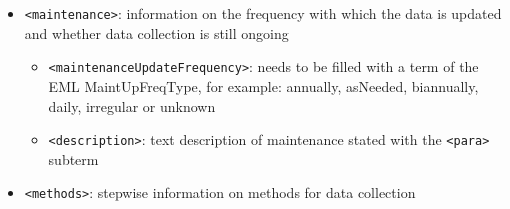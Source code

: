 \documentclass[
  oneside]{book}
\providecommand{\tightlist}{%
  \setlength{\itemsep}{0pt}\setlength{\parskip}{0pt}}
\begin{document}
\begin{itemize}
\begin{itemize}
    \begin{itemize}
    \tightlist
    \item
      \texttt{\textless{}generalTaxonomicCoverage\textgreater{}}: text description of the taxa included in the data
    \item
      \texttt{\textless{}taxonomicClassification\textgreater{}}: taxonomic classification of the range of taxa included in the data, specified through a set of subterms:

      \begin{itemize}
      \tightlist
      \item
        \texttt{\textless{}taxonRankName\textgreater{}}: taxonomic level of information
      \item
        \texttt{\textless{}taxonRankValue\textgreater{}}: name of the taxonomic rank being described
      \item
        \texttt{\textless{}commonName\textgreater{}}
      \item
        \texttt{\textless{}taxonID\textgreater{}}: identifier of the taxon from a certain provider that has to be specified with the attribute ``provider'' containing a \hyperref[URI]{URI} (e.g., provider = ``\url{https://eol.org}'' if the taxon ID is retrieved from EOL)
      \end{itemize}
    \end{itemize}
  \end{itemize}
\item
  {\texttt{\textless{}maintenance\textgreater{}}}: information on the frequency with which the data is updated and whether data collection is still ongoing

  \begin{itemize}
  \tightlist
  \item
    \texttt{\textless{}maintenanceUpdateFrequency\textgreater{}}: needs to be filled with a term of the EML MaintUpFreqType, for example: annually, asNeeded, biannually, daily, irregular or unknown
  \item
    \texttt{\textless{}description\textgreater{}}: text description of maintenance stated with the \texttt{\textless{}para\textgreater{}} subterm
  \end{itemize}
\item
  {\texttt{\textless{}methods\textgreater{}}}: stepwise information on methods for data collection


\end{itemize}
\end{document}
